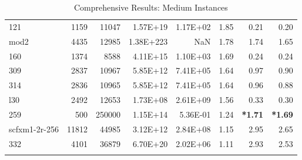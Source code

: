 \documentclass[10pt]{article}
\newcommand{\red}{
	\color{red}	
	}
\begin{document}
\begin{longtable}{|l|r|r|r|r|r|r|r|}
121	&	1159	&	11047	&	1.57E+19	&	1.17E+02	&	1.85	&	0.21	&	0.20	\\
mod2	&	4435	&	12985	&	1.38E+223	&	NaN	&	1.78	&	1.74	&	1.65	\\
160	&	1374	&	8588	&	4.11E+15	&	1.10E+03	&	1.69	&	0.24	&	0.24	\\
309	&	2837	&	10967	&	5.85E+12	&	7.41E+05	&	1.64	&	0.97	&	0.90	\\
314	&	2836	&	10965	&	5.85E+12	&	7.41E+05	&	1.64	&	0.96	&	0.88	\\
l30	&	2492	&	12653	&	1.73E+08	&	2.61E+09	&	1.56	&	0.33	&	0.30	\\
259	&	500	&	250000	&	1.15E+14	&	5.36E-01	&	1.24	&	{\bf \red *1.71}	&	{\bf \red *1.69}	\\
scfxm1-2r-256	&	11812	&	44985	&	3.12E+12	&	2.84E+08	&	1.15	&	2.95	&	2.65	\\
332	&	4101	&	36879	&	6.70E+20	&	2.02E+06	&	1.11	&	2.93	&	2.53	\\
\hline
\caption{Comprehensive Results: Medium Instances}
\small
\centering
\label{supptab:all_medium}
\end{longtable}
\end{document}
